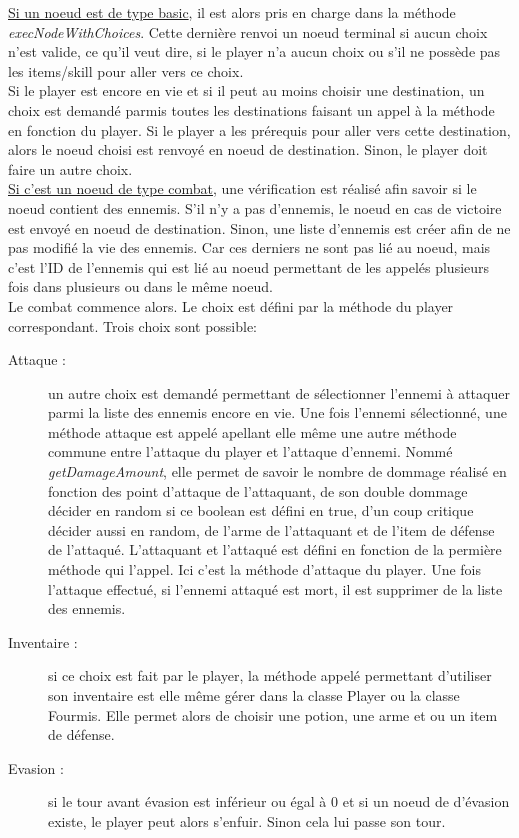 		\underline{Si un noeud est de type basic}, il est alors pris en charge dans la méthode \textit{execNodeWithChoices}. Cette dernière renvoi un noeud terminal si aucun choix n'est valide, ce qu'il veut dire, si le player n'a aucun choix ou s'il ne possède pas les items/skill pour aller vers ce choix.\\
		Si le player est encore en vie et si il peut au moins choisir une destination, un choix est demandé parmis toutes les destinations faisant un appel à la méthode en fonction du player. Si le player a les prérequis pour aller vers cette destination, alors le noeud choisi est renvoyé en noeud de destination. Sinon, le player doit faire un autre choix.\\

		\underline{Si c'est un noeud de type combat}, une vérification est réalisé afin savoir si le noeud contient des ennemis. S'il n'y a pas d'ennemis, le noeud en cas de victoire est envoyé en noeud de destination. Sinon, une liste d'ennemis est créer afin de ne pas modifié la vie des ennemis. Car ces derniers ne sont pas lié au noeud, mais c'est l'ID de l'ennemis qui est lié au noeud permettant de les appelés plusieurs fois dans plusieurs ou dans le même noeud.\\
		Le combat commence alors. Le choix est défini par la méthode du player correspondant. Trois choix sont possible:\\
		\begin{description}
			\item[Attaque :]{un autre choix est demandé permettant de sélectionner l'ennemi à attaquer parmi la liste des ennemis encore en vie. Une fois l'ennemi sélectionné, une méthode attaque est appelé apellant elle même une autre méthode commune entre l'attaque du player et l'attaque d'ennemi. Nommé \textit{getDamageAmount}, elle permet de savoir le nombre de dommage réalisé en fonction des point d'attaque de l'attaquant, de son double dommage décider en random si ce boolean est défini en true, d'un coup critique décider aussi en random, de l'arme de l'attaquant et de l'item de défense de l'attaqué. L'attaquant et l'attaqué est défini en fonction de la permière méthode qui l'appel. Ici c'est la méthode d'attaque du player. Une fois l'attaque effectué, si l'ennemi attaqué est mort, il est supprimer de la liste des ennemis.}
			\item[Inventaire :]{si ce choix est fait par le player, la méthode appelé permettant d'utiliser son inventaire est elle même gérer dans la classe Player ou la classe Fourmis. Elle permet alors de choisir une potion, une arme et ou un item de défense.}
			\item[Evasion :]{si le tour avant évasion est inférieur ou égal à 0 et si un noeud de d'évasion existe, le player peut alors s'enfuir. Sinon cela lui passe son tour.}
		\end{description}

